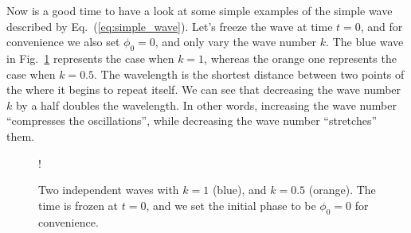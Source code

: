 Now is a good time to have a look at some simple examples of the simple wave described by Eq.~(\ref{eq:simple_wave}).
Let's freeze the wave at time $t=0$, and for convenience we also set $\phi_0 = 0$, and only vary the wave number $k$.
The blue wave in Fig.~\ref{fig:two-waves} represents the case when $k=1$, whereas the orange one represents the case when $k=0.5$.
The wavelength is the shortest distance between two points of the where it begins to repeat itself.
We can see that decreasing the wave number $k$ by a half doubles the wavelength.
In other words, increasing the wave number ``compresses the oscillations'', while decreasing the wave number ``stretches'' them.

\begin{figure}[t]
    \centering
    \resizebox {0.6\textwidth} {!} {
    }
    \caption[Same frequency, different wave numbers.]{Two independent waves with $k=1$ (blue), and $k=0.5$ (orange). The time is frozen at $t=0$, and we set the initial phase to be $\phi_0=0$ for convenience.}    
    \label{fig:two-waves}
\end{figure}


